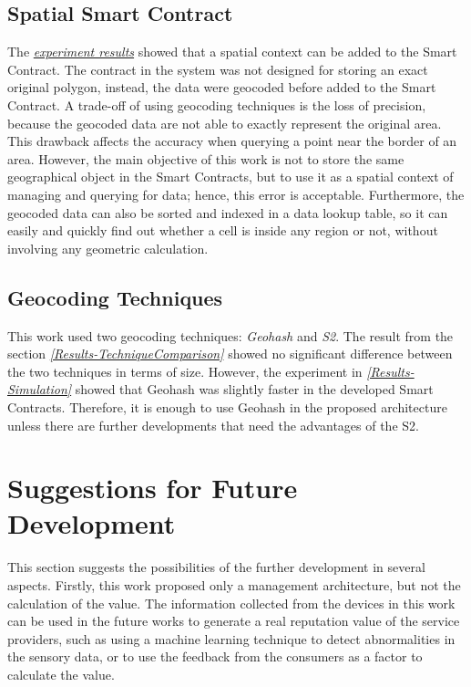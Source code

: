 \subsection*{Spatial Smart Contract} \label{Conclusion-Disccusion-Spatial}

\npara The \hyperref[Results]{\textit{experiment results}} showed that a spatial context can be added to the Smart Contract.
The contract in the system was not designed for storing an exact original polygon, instead, the data were geocoded before added to the Smart Contract.
A trade-off of using geocoding techniques is the loss of precision, because the geocoded data are not able to exactly represent the original area.
This drawback affects the accuracy when querying a point near the border of an area.
However, the main objective of this work is not to store the same geographical object in the Smart Contracts, but to use it as a spatial context of managing and querying for data; hence, this error is acceptable.
Furthermore, the geocoded data can also be sorted and indexed in a data lookup table, so it can easily and quickly find out whether a cell is inside any region or not, without involving any geometric calculation.

\subsection*{Geocoding Techniques} \label{Conclusion-Disscussion-Geocoding}

\npara This work used two geocoding techniques: \textit{Geohash} and \textit{S2}.
The result from the section \textit{\ref{Results-TechniqueComparison}} showed no significant difference between the two techniques in terms of size.
However, the experiment in \textit{\ref{Results-Simulation}} showed that Geohash was slightly faster in the developed Smart Contracts.
Therefore, it is enough to use Geohash in the proposed architecture unless there are further developments that need the advantages of the S2.

\section*{Suggestions for Future Development} \label{Conclusion-Suggestions}

\npara This section suggests the possibilities of the further development in several aspects.
Firstly, this work proposed only a management architecture, but not the calculation of the value.
The information collected from the devices in this work can be used in the future works to generate a real reputation value of the service providers, such as using a machine learning technique to detect abnormalities in the sensory data, or to use the feedback from the consumers as a factor to calculate the value.

